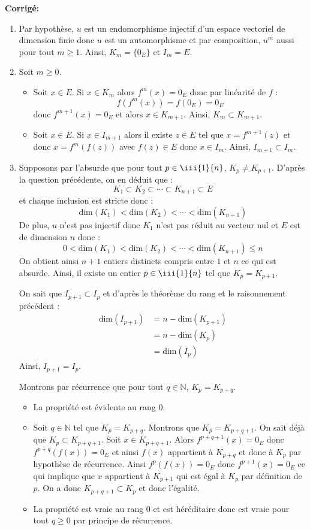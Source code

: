 \documentclass[a4paper,twoside,french,11pt]{VcCours}
\newcommand{\corr}{\textbf{Corrigé:}}
\begin{document}
\corr \begin{enumerate}
\item Par hypothèse, $u$ est un endomorphisme injectif d'un espace vectoriel de dimension finie donc $u$ est un automorphisme et par composition, $u^m$ aussi pour tout $m \geq 1$. Ainsi, $K_m =\lbrace 0_E \rbrace$ et $I_m = E$.
\item Soit $m \geq 0$.
\begin{itemize}
\item Soit $x \in E$. Si $x \in K_m$ alors $f^m(x)=0_E$ donc par linéarité de $f$ :
$$ f(f^m(x))=f(0_E)=0_E$$
donc $f^{m+1}(x)=0_E$ et alors $x \in K_{m+1}$. Ainsi, $K_m \subset K_{m+1}$.
\item Soit $x \in E$. Si $x \in I_{m+1}$ alors il existe $z \in E$ tel que $x = f^{m+1}(z)$ et donc $x= f^m(f(z))$ avec $f(z) \in E$ donc $x \in I_m$. Ainsi, $I_{m+1} \subset I_m$.
\end{itemize}

\item Supposons par l'absurde que pour tout $p \in \iii{1}{n}$, $K_p \neq K_{p+1}$. D'après la question précédente, on en déduit que :
$$  K_1 \subset K_2 \subset \cdots \subset K_{n+1} \subset E$$
et chaque inclusion est stricte donc :
$$  \textrm{dim}(K_1) < \textrm{dim}(K_2) < \cdots < \textrm{dim}(K_{n+1})$$
De plus, $u$ n'est pas injectif donc $K_1$ n'est pas réduit au vecteur nul et $E$ est de dimension $n$ donc :
$$  0< \textrm{dim}(K_1) < \textrm{dim}(K_2) < \cdots < \textrm{dim}(K_{n+1}) \leq n$$
On obtient ainsi $n+1$ entiers distincts compris entre $1$ et $n$ ce qui est absurde. Ainsi, il existe un entier $p \in \iii{1}{n}$ tel que $K_p=K_{p+1}$. 



\noindent On sait que $I_{p+1} \subset I_{p}$ et d'après le théorème du rang et le raisonnement précédent :
\begin{align*}
 \textrm{dim}(I_{p+1}) & = n - \textrm{dim}(K_{p+1})  \\
 &  = n - \textrm{dim}(K_{p})  \\
 & =  \textrm{dim}(I_{p})
 \end{align*}
 Ainsi, $I_{p+1}=I_p$.




\noindent Montrons par récurrence que pour tout $q \in \mathbb{N}$, $K_p = K_{p+q}$.
\begin{itemize}
\item La propriété est évidente au rang $0$. 
\item Soit $q \in \mathbb{N}$ tel que $K_p= K_{p+q}$. Montrons que $K_p=K_{p+q+1}$. On sait déjà que $K_p \subset K_{p+q+1}$. Soit $x \in  K_{p+q+1}$. Alors $f^{p+q+1}(x)=0_E$ donc $f^{p+q}(f(x))=0_E$ et ainsi $f(x)$ appartient à $K_{p+q}$ et donc à $K_p$ par hypothèse de récurrence. Ainsi $f^{p}(f(x))=0_E$ donc $f^{p+1}(x)=0_E$ ce qui implique que $x$ appartient à $K_{p+1}$ qui est égal à $K_p$ par définition de $p$. On a donc $K_{p+q+1} \subset K_p$ et donc l'égalité.
\item La propriété est vraie au rang $0$ et est héréditaire donc est vraie pour tout $q \geq 0$ par principe de récurrence.
\end{itemize}




\end{enumerate}
\end{document}
